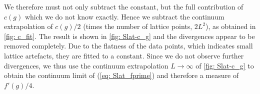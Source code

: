 %
%
We therefore must not only subtract the constant, but the full contribution of $c(g)$ which we do not know exactly. Hence we subtract the continuum extrapolation of $c(g)/2$ (times the number of lattice points, $2L^{2}$), as obtained in \autoref{fig: c_fit}. The result is shown in \autoref{fig: Slat-c_g} and the divergences appear to be removed completely. Due to the flatness of the data points, which indicates small lattice artefacts, they are fitted to a  constant. Since we do not observe further divergences, we thus use the continuum extrapolation $L\to\infty$ of \autoref{fig: Slat-c_g} to obtain the continuum limit of (\ref{eq: Slat_fprime}) and therefore a measure of $f'(g)/4$.